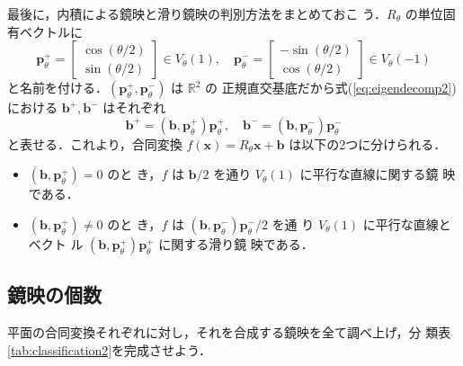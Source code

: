 \documentclass[11pt, uplatex, dvipdfmx, titlepage]{jsarticle}
\theoremstyle{definition}
\newtheorem{theorem}{定理}[section]
\newtheorem*{definition}{定義}
\begin{document}
 最後に，内積による鏡映と滑り鏡映の判別方法をまとめておこ
 う．$R_{\theta}$ の単位固有ベクトルに
 \[
   \bm{p}^{+}_{\theta} = \left[
     \begin{array}{r}
       \cos(\theta/2)\\
       \sin(\theta/2)
     \end{array}
   \right] \in V_{\theta}(1), \quad \bm{p}^{-}_{\theta} = \left[
     \begin{array}{r}
       -\sin(\theta/2)\\
       \cos(\theta/2)
     \end{array}
   \right] \in V_{\theta}(-1)
 \]
 と名前を付ける．$\left(\bm{p}_{\theta}^{+}, \bm{p}_{\theta}^{-}\right)$ は $\mathbb{R}^2$ の
 正規直交基底だから式(\ref{eq:eigendecomp2})における $\bm{b}^{+},
 \bm{b}^{-}$ はそれぞれ
 \[
   \bm{b}^{+} = (\bm{b}, \bm{p}_{\theta}^{+}) \bm{p}_{\theta}^{+} ,
   \quad  \bm{b}^{-} =  (\bm{b}, \bm{p}_{\theta}^{-})\bm{p}_{\theta}^{-}
 \]
 と表せる．これより，合同変換 $f(\bm{x}) = R_{\theta} \bm{x} + \bm{b}$
 は以下の2つに分けられる．
 \begin{itemize}
   \setlength{\itemsep}{1zh}
 \item $\left(\bm{b}, \bm{p}_{\theta}^{+} \right)=0$ のと
   き，$f$ は $\bm{b}/2$ を通り $V_{\theta}(1)$ に平行な直線に関する鏡
   映である．
   
 \item $\left(\bm{b}, \bm{p}_{\theta}^{+}\right) \neq 0$ のと
   き，$f$ は
   $\left(\bm{b},\bm{p}_{\theta}^{-}\right)\bm{p}_{\theta}^{-}/2$ を通
   り $V_{\theta}(1)$ に平行な直線とベクト
   ル $(\bm{b},\bm{p}_{\theta}^{+})\bm{p}_{\theta}^{+}$ に関する滑り鏡
   映である．
 \end{itemize}



\subsection{鏡映の個数}

平面の合同変換それぞれに対し，それを合成する鏡映を全て調べ上げ，分
類表\ref{tab:classification2}を完成させよう．


\end{document}
